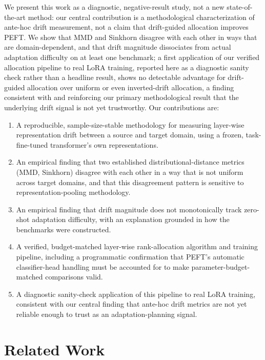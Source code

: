 \documentclass[conference]{IEEEtran}
\begin{document}
We present this work as a diagnostic, negative-result study, not a new state-of-the-art method: our central contribution is a methodological characterization of ante-hoc drift measurement, not a claim that drift-guided allocation improves PEFT. We show that MMD and Sinkhorn disagree with each other in ways that are domain-dependent, and that drift magnitude dissociates from actual adaptation difficulty on at least one benchmark; a first application of our verified allocation pipeline to real LoRA training, reported here as a diagnostic sanity check rather than a headline result, shows no detectable advantage for drift-guided allocation over uniform or even inverted-drift allocation, a finding consistent with and reinforcing our primary methodological result that the underlying drift signal is not yet trustworthy. Our contributions are:

\begin{enumerate}
\item A reproducible, sample-size-stable methodology for measuring layer-wise representation drift between a source and target domain, using a frozen, task-fine-tuned transformer's own representations.
\item An empirical finding that two established distributional-distance metrics (MMD, Sinkhorn) disagree with each other in a way that is not uniform across target domains, and that this disagreement pattern is sensitive to representation-pooling methodology.
\item An empirical finding that drift magnitude does not monotonically track zero-shot adaptation difficulty, with an explanation grounded in how the benchmarks were constructed.
\item A verified, budget-matched layer-wise rank-allocation algorithm and training pipeline, including a programmatic confirmation that PEFT's automatic classifier-head handling must be accounted for to make parameter-budget-matched comparisons valid.
\item A diagnostic sanity-check application of this pipeline to real LoRA training, consistent with our central finding that ante-hoc drift metrics are not yet reliable enough to trust as an adaptation-planning signal.
\end{enumerate}

\section{Related Work}
\label{sec:related}
\end{document}
